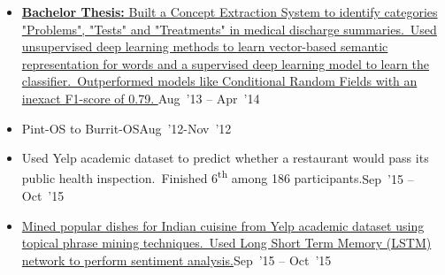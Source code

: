 \documentclass[10pt,a4paper]{article}
\begin{document}
\vspace{0.15cm}
\begin{itemize}[labelindent=1.5em,labelsep=-0.3cm,leftmargin=*]
\item \headedsubsection 
    {\href{}{\normalfont \textbf{Bachelor Thesis:} Built a Concept Extraction System to identify categories "Problems", "Tests" and "Treatments" in medical discharge summaries.~Used unsupervised deep learning methods to learn vector-based semantic representation for words and a supervised deep learning model to learn the classifier.~Outperformed models like Conditional Random Fields with an inexact F1-score of 0.79.
}}{{{Aug~'13 -- Apr~'14}}}
    {}

\item \headedsubsection
{Pint-OS to Burrit-OS}{{{Aug~'12-Nov~'12}}}
{}


\item \headedsubsection  %
  {{\normalfont Used Yelp academic dataset to predict whether a restaurant would pass its public health inspection.~Finished 6\textsuperscript{th} among 186 participants.}}{{{Sep~'15 -- Oct~'15}}}
  {}

\item \headedsubsection  %
  {\href{}{\normalfont Mined popular dishes for Indian cuisine from Yelp academic dataset using topical phrase mining techniques.~Used Long Short Term Memory (LSTM) network to perform sentiment analysis.}}{{{Sep~'15 -- Oct~'15}}}
  {}



\end{itemize}
\end{document}

